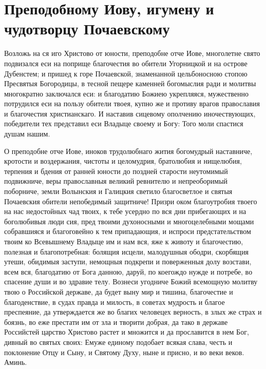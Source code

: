 \section{Преподобному Иову, игумену и чудотворцу Почаевскому}\begin{mymulticols}
 


Возложь на ся иго Христово от юности, преподобне отче Иове, многолетне свято подвизался еси на поприще благочестия во обители Угорницкой и на острове Дубенстем; и пришед к горе Почаевской, знаменанной цельбоносною стопою Пресвятыя Богородицы, в тесной пещере каменней богомыслия ради и молитвы многократно заключался еси: и благодатию Божиею укрепляяся, мужественно потрудился еси на пользу обители твоея, купно же и противу врагов православия и благочестия христианскаго. И наставив сицевому ополчению иночествующих, победители тех представил еси Владыце своему и Богу: Того моли спастися душам нашим.



О преподобне отче Иове, иноков трудолюбнаго жития богомудрый наставниче, кротости и воздержания, чистоты и целомудрия, братолюбия и нищелюбия, терпения и бдения от ранней юности до поздней старости неутомимый подвижниче, веры православныя великий ревнителю и непреоборимый поборниче, земли Волынския и Галицкия светило благосветлое и святыя Почаевския обители непобедимый защитниче! Призри оком благоутробия твоего на нас недостойных чад твоих, к тебе усердно по вся дни прибегающих и на боголюбивыя люди сия, пред твоими духоносными и многоцелебными мощами собравшияся и благоговейно к тем припадающия, и испроси предстательством твоим ко Всевышнему Владыце им и нам вся, яже к животу и благочестию, полезная и благопотребная: болящия исцели, малодушныя ободри, скорбящия утеши, обидимыя заступи, немощныя подкрепи и поверженныя долу возстави, всем вся, благодатию от Бога данною, даруй, по коегождо нужде и потребе, во спасение души и во здравие телу. Вознеси угодниче Божий всемощную молитву твою о Российской державе, да будет выну мир и тишина, благочестие и благоденствие, в судах правда и милость, в советах мудрость и благое преспеяние, да утверждается же во благих человецех верность, в злых же страх и боязнь, во еже престати им от зла и творити добрая, да тако в державе Российстей царство Христово растет и множится и да прославится в нем Бог, дивный во святых своих: Емуже единому подобает всякая слава, честь и поклонение Отцу и Сыну, и Святому Духу, ныне и присно, и во веки веков. Аминь.


\end{mymulticols}

